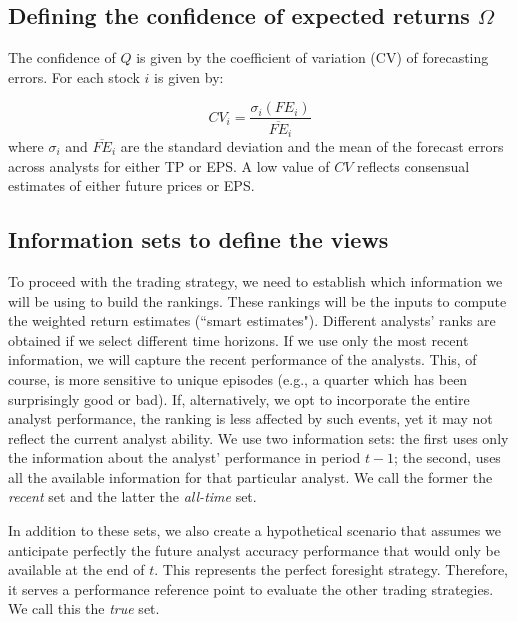 \documentclass{article}\usepackage[]{graphicx}\usepackage[]{color}
\newcommand{\tr}{\textit{true}}
\newcommand{\naive}{\textit{recent}}
\newcommand{\default}{\textit{all-time}}
\begin{document}
\subsection{Defining the confidence of expected returns $\Omega$}
\label{def-omega}
The confidence of $Q$ is given by the coefficient of variation (CV) of forecasting errors. For each stock $i$ is given by:

\begin{equation}
CV_{i} = \frac{\sigma_i (FE_{i})}{\overline{FE}_{i}}
\end{equation}
where $\sigma_i$ and $\overline{FE}_i$ are the standard deviation and the mean of the forecast errors across analysts for either TP or EPS. A low value of $CV$ reflects consensual estimates of either future prices or EPS.



\subsection{Information sets to define the views}

To proceed with the trading strategy, we need to establish which information we  will be using to build the rankings. These rankings will be the inputs to compute the weighted return estimates (``smart estimates"). Different analysts' ranks are obtained  if we select different time horizons. If we use only the most  recent information, we will capture the recent performance of the analysts. This, of course, is more sensitive to unique episodes (e.g., a quarter which has been surprisingly good or bad). If, alternatively, we opt to incorporate the entire analyst performance, the ranking is less affected by such events, yet it may not reflect the current analyst ability. We use two information sets: the first uses only the  information about the analyst' performance in period $t-1$; the second, uses all the available  information for that particular analyst. We call the former the \naive{} set and the latter the \default{} set. 

In addition to these sets,  we also create a hypothetical scenario that assumes we anticipate perfectly the future analyst accuracy performance  that would only be available at the end of $t$.  This represents the perfect foresight strategy. Therefore, it serves a performance reference point to evaluate the other trading strategies. We call this the \tr{} set. 
\end{document}
